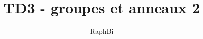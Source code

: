 \documentclass[french,a4paper,10pt]{article}
\title{\color{astral} \sffamily \bfseries TD3 - groupes et anneaux 2}
\author{RaphBi}
\begin{document}
    \maketitle
    \begin{td-exo}[1]


    \end{td-exo}
\end{document}
